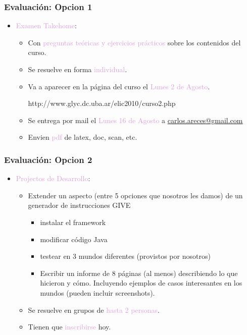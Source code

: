 \documentclass[compress,color=usenames]{beamer}
\newcommand{\mH}[1]{\textcolor{Plum}{#1}}
\begin{document}
\begin{frame}
\frametitle{Evaluaci\'on: Opcion 1}

\begin{itemize}
\item \mH{Examen Takehome}:  
\begin{itemize}
\item Con \mH{preguntas te\'oricas y ejercicios pr\'acticos} sobre los contenidos del curso.
\item Se resuelve en forma \mH{individual}. 

\item Va a aparecer en la p\'agina del curso el \mH{Lunes 2 de Agosto}. 
\medskip

\centerline{http://www.glyc.dc.uba.ar/elic2010/curso2.php}
\medskip

\item Se entrega por mail el \mH{Lunes 16 de Agosto} a \url{carlos.areces@gmail.com}
\item Envien \mH{pdf} de latex, doc, scan, etc. 
\end{itemize}
\end{itemize}
\end{frame}

\begin{frame}
\frametitle{Evaluaci\'on: Opcion 2}


\begin{itemize}

\item \mH{Projectos de Desarrollo}: 
\begin{itemize}


\item Extender un aspecto (entre 5 opciones que nosotros les damos) de un generador 
de instrucciones GIVE 
   \begin{itemize}
      \item instalar el framework
      \item modificar c\'odigo Java
      \item testear en 3 mundos diferentes (provistos por nosotros)
      \item Escribir un informe de 8 p\'aginas (al menos) describiendo 
      lo que hicieron y c\'omo.  Incluyendo ejemplos de casos interesantes 
      en los mundos (pueden incluir screenshots). 
   \end{itemize}

\item Se resuelve en grupos de \mH{hasta 2 personas}. 

\item Tienen que \mH{inscribirse} hoy. 

\end{itemize}
\end{itemize}
\end{frame}
\end{document}
